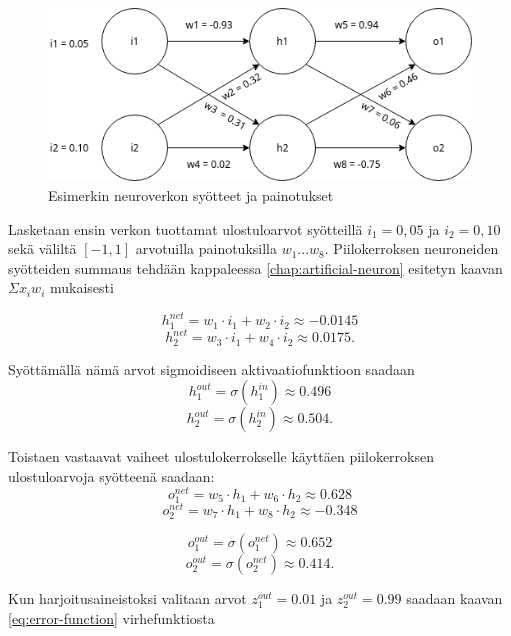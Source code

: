 \documentclass[finnish]{tktltiki2}
\theoremstyle{definition}
\theoremstyle{remark}
\begin{document}
    \begin{figure}[h]
    \centering
    \includegraphics[scale=0.6]{draw-io-backprop-example}
    \caption{Esimerkin neuroverkon syötteet ja painotukset}
    \label{pic:backprop-example}
    \end{figure}

  Lasketaan ensin verkon tuottamat ulostuloarvot syötteillä $i_1 = 0,05$ ja $i_2 = 0,10$ sekä väliltä $[-1, 1]$ arvotuilla painotuksilla $w_1...w_8$. Piilokerroksen neuroneiden syötteiden summaus tehdään kappaleessa \ref{chap:artificial-neuron} esitetyn kaavan $\Sigma x_i w_i$ mukaisesti
  
  $$h_{1}^{net} = w_1 \cdot i_1 + w_2 \cdot i_2 \approx -0.0145$$
  $$h_{2}^{net} = w_3 \cdot i_1 + w_4 \cdot i_2 \approx 0.0175.$$

  Syöttämällä nämä arvot sigmoidiseen aktivaatiofunktioon saadaan
  $$h_{1}^{out} = \sigma(h_{1}^{in}) \approx 0.496$$
  $$h_{2}^{out} = \sigma(h_{2}^{in}) \approx 0.504.$$

  Toistaen vastaavat vaiheet ulostulokerrokselle käyttäen piilokerroksen ulostuloarvoja syötteenä saadaan:
  $$o_{1}^{net}= w_5 \cdot h_1 + w_6 \cdot h_2 \approx 0.628$$
  $$o_{2}^{net}= w_7 \cdot h_1 + w_8 \cdot h_2 \approx -0.348$$

  $$o_{1}^{out} = \sigma(o_{1}^{net}) \approx 0.652$$
  $$o_{2}^{out} = \sigma(o_{2}^{net}) \approx 0.414.$$

  Kun harjoitusaineistoksi valitaan arvot $z_{1}^{out} = 0.01$ ja $z_{2}^{out} = 0.99$ saadaan kaavan \ref{eq:error-function} virhefunktiosta 
\end{document}

